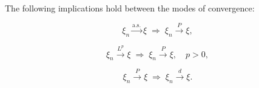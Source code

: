 The following implications hold between the modes of convergence:

$$\xi_n \xrightarrow{\text{a.s.}} \xi \;\Longrightarrow\; \xi_n \xrightarrow{P} \xi,$$

$$\xi_n \xrightarrow{L^p} \xi \;\Longrightarrow\; \xi_n \xrightarrow{P} \xi, \quad p > 0,$$

$$\xi_n \xrightarrow{P} \xi \;\Longrightarrow\; \xi_n \xrightarrow{d} \xi.$$
